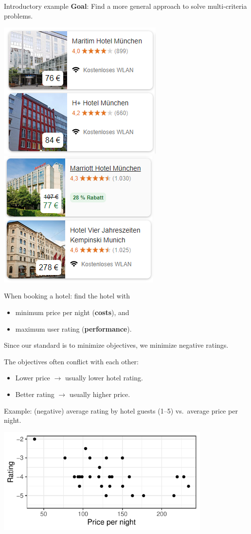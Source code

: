\documentclass[11pt,compress,t,notes=noshow,xcolor=table]{beamer}
\begin{document}
\begin{vbframe}{Introductory example}
\bigskip
\textbf{Goal}: Find a more general approach to solve multi-criteria problems.

\begin{center}
\includegraphics[width=0.35\linewidth]{figure_man/booking1.png}
\quad
\includegraphics[width=0.35\linewidth]{figure_man/booking2.png}
\end{center}

When booking a hotel: find the hotel with
\begin{itemize}
\item minimum price per night (\textbf{costs}), and
\item maximum user rating (\textbf{performance}).
\end{itemize}

\begin{footnotesize}
Since our standard is to minimize objectives, we minimize negative ratings.
\end{footnotesize}

\framebreak

The objectives often conflict with each other:
\begin{itemize}
\item Lower price $\to$ usually lower hotel rating.
\item Better rating $\to$ usually higher price.
\end{itemize}

Example: (negative) average rating by hotel guests (1--5) vs.\ average price per night.

\bigskip
\begin{center}
\includegraphics[width=0.8\textwidth]{figure_man/expedia-1-1.pdf}
\end{center}


\end{vbframe}
\end{document}

